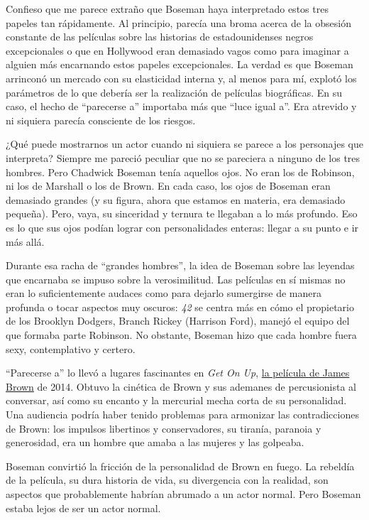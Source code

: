 Confieso que me parece extraño que Boseman haya interpretado estos tres
papeles tan rápidamente. Al principio, parecía una broma acerca de la
obsesión constante de las películas sobre las historias de
estadounidenses negros excepcionales o que en Hollywood eran demasiado
vagos como para imaginar a alguien más encarnando estos papeles
excepcionales. La verdad es que Boseman arrinconó un mercado con su
elasticidad interna y, al menos para mí, explotó los parámetros de lo
que debería ser la realización de películas biográficas. En su caso, el
hecho de ``parecerse a'' importaba más que ``luce igual a''. Era
atrevido y ni siquiera parecía consciente de los riesgos.

¿Qué puede mostrarnos un actor cuando ni siquiera se parece a los
personajes que interpreta? Siempre me pareció peculiar que no se
pareciera a ninguno de los tres hombres. Pero Chadwick Boseman tenía
aquellos ojos. No eran los de Robinson, ni los de Marshall o los de
Brown. En cada caso, los ojos de Boseman eran demasiado grandes (y su
figura, ahora que estamos en materia, era demasiado pequeña). Pero,
vaya, su sinceridad y ternura te llegaban a lo más profundo. Eso es lo
que sus ojos podían lograr con personalidades enteras: llegar a su punto
e ir más allá.

Durante esa racha de ``grandes hombres'', la idea de Boseman sobre las
leyendas que encarnaba se impuso sobre la verosimilitud. Las películas
en sí mismas no eran lo suficientemente audaces como para dejarlo
sumergirse de manera profunda o tocar aspectos muy oscuros: \emph{42} se
centra más en cómo el propietario de los Brooklyn Dodgers, Branch Rickey
(Harrison Ford), manejó el equipo del que formaba parte Robinson. No
obstante, Boseman hizo que cada hombre fuera sexy, contemplativo y
certero.

``Parecerse a'' lo llevó a lugares fascinantes en \emph{Get On Up},
\href{https://grantland.com/features/guardians-of-the-galaxy-get-on-up-review/}{la
película de James Brown} de 2014. Obtuvo la cinética de Brown y sus
ademanes de percusionista al conversar, así como su encanto y la
mercurial mecha corta de su personalidad. Una audiencia podría haber
tenido problemas para armonizar las contradicciones de Brown: los
impulsos libertinos y conservadores, su tiranía, paranoia y generosidad,
era un hombre que amaba a las mujeres y las golpeaba.

Boseman convirtió la fricción de la personalidad de Brown en fuego. La
rebeldía de la película, su dura historia de vida, su divergencia con la
realidad, son aspectos que probablemente habrían abrumado a un actor
normal. Pero Boseman estaba lejos de ser un actor normal.

